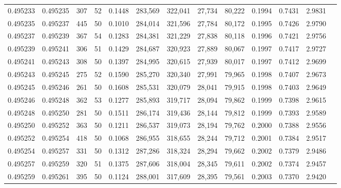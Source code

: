 \begin{tabular}{rrrrrrrrrrrrr}
0.495233 & 0.495235 &   307 &  52 &                                     0.1448 & 283,569 & 322,041 &  27,734 &  80,222 & 0.1994 & 0.7431 & 2.9831 \\
0.495235 & 0.495237 &   445 &  50 &                                     0.1010 & 284,014 & 321,596 &  27,784 &  80,172 & 0.1995 & 0.7426 & 2.9790 \\
0.495237 & 0.495239 &   367 &  54 &                                     0.1283 & 284,381 & 321,229 &  27,838 &  80,118 & 0.1996 & 0.7421 & 2.9756 \\
0.495239 & 0.495241 &   306 &  51 &                                     0.1429 & 284,687 & 320,923 &  27,889 &  80,067 & 0.1997 & 0.7417 & 2.9727 \\
0.495241 & 0.495243 &   308 &  50 &                                     0.1397 & 284,995 & 320,615 &  27,939 &  80,017 & 0.1997 & 0.7412 & 2.9699 \\
0.495243 & 0.495245 &   275 &  52 &                                     0.1590 & 285,270 & 320,340 &  27,991 &  79,965 & 0.1998 & 0.7407 & 2.9673 \\
0.495245 & 0.495246 &   261 &  50 &                                     0.1608 & 285,531 & 320,079 &  28,041 &  79,915 & 0.1998 & 0.7403 & 2.9649 \\
0.495246 & 0.495248 &   362 &  53 &                                     0.1277 & 285,893 & 319,717 &  28,094 &  79,862 & 0.1999 & 0.7398 & 2.9615 \\
0.495248 & 0.495250 &   281 &  50 &                                     0.1511 & 286,174 & 319,436 &  28,144 &  79,812 & 0.1999 & 0.7393 & 2.9589 \\
0.495250 & 0.495252 &   363 &  50 &                                     0.1211 & 286,537 & 319,073 &  28,194 &  79,762 & 0.2000 & 0.7388 & 2.9556 \\
0.495252 & 0.495254 &   418 &  50 &                                     0.1068 & 286,955 & 318,655 &  28,244 &  79,712 & 0.2001 & 0.7384 & 2.9517 \\
0.495254 & 0.495257 &   331 &  50 &                                     0.1312 & 287,286 & 318,324 &  28,294 &  79,662 & 0.2002 & 0.7379 & 2.9486 \\
0.495257 & 0.495259 &   320 &  51 &                                     0.1375 & 287,606 & 318,004 &  28,345 &  79,611 & 0.2002 & 0.7374 & 2.9457 \\
0.495259 & 0.495261 &   395 &  50 &                                     0.1124 & 288,001 & 317,609 &  28,395 &  79,561 & 0.2003 & 0.7370 & 2.9420 \\

\end{tabular}
